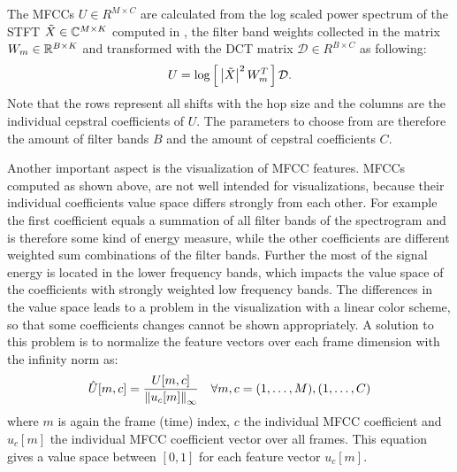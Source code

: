 \FloatBarrier
\noindent
The MFCCs $U \in R^{M \times C}$ are calculated from the log scaled power spectrum of the STFT $\tilde{X} \in \mathbb{C}^{M \times K}$ computed in , the filter band weights collected in the matrix $W_m \in \mathbb{R}^{B \times K}$ and transformed with the DCT matrix $\mathcal{D} \in R^{B \times C}$ as following:
\begin{equation}\label{eq:signal_mfcc_mfcc}
    U = \log{ \left[ \, \abs{\tilde{X}}^2 \, W_m^T \, \right] } \, \mathcal{D}.
\end{equation}
Note that the rows represent all shifts with the hop size and the columns are the individual cepstral coefficients of $U$.
The parameters to choose from are therefore the amount of filter bands $B$ and the amount of cepstral coefficients $C$.

Another important aspect is the visualization of MFCC features.
MFCCs computed as shown above, are not well intended for visualizations, because their individual coefficients value space differs strongly from each other.
For example the first coefficient equals a summation of all filter bands of the spectrogram and is therefore some kind of energy measure, while the other coefficients are different weighted sum combinations of the filter bands.
Further the most of the signal energy is located in the lower frequency bands, which impacts the value space of the coefficients with strongly weighted low frequency bands.
The differences in the value space leads to a problem in the visualization with a linear color scheme, so that some coefficients changes cannot be shown appropriately.
A solution to this problem is to normalize the feature vectors over each frame dimension with the infinity norm as:
\begin{equation}\label{eq:signal_mfcc_norm}
  \hat{U}[m, c] = \frac{U[m, c]}{\norm{u_c[m]}_\infty} \quad \forall m, c = (1, \dots, M), (1, \dots, C)
\end{equation}
where $m$ is again the frame (time) index, $c$ the individual MFCC coefficient and $u_c[m]$ the individual MFCC coefficient vector over all frames.
This equation gives a value space between $[0, 1]$ for each feature vector $u_c[m]$.

